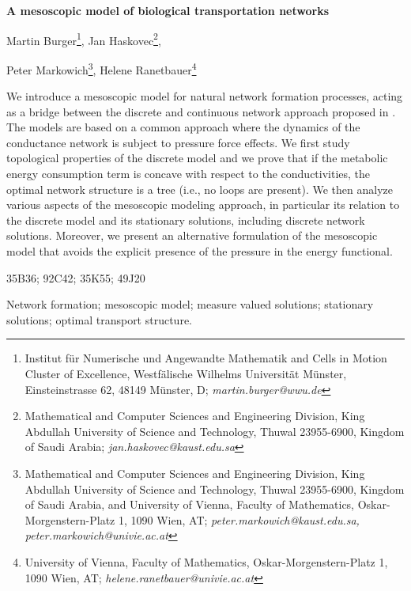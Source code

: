\documentclass{article}
\numberwithin{equation}{section}
\begin{document}
\centerline{{\Large\textbf{A mesoscopic model of biological transportation networks}}}
\vskip 7mm

\centerline{
	{\large Martin Burger}\footnote{Institut f\"ur Numerische und Angewandte Mathematik and Cells in Motion Cluster of Excellence, Westf\"alische Wilhelms Universit\"at M\"unster, Einsteinstrasse 62, 48149 M\"unster, D; 
		{\it martin.burger@wwu.de}},
	{\large Jan Haskovec}\footnote{Mathematical and Computer Sciences and Engineering Division,
		King Abdullah University of Science and Technology,
		Thuwal 23955-6900, Kingdom of Saudi Arabia; 
		{\it jan.haskovec@kaust.edu.sa}},
}
\centerline{
	{\large Peter Markowich}\footnote{Mathematical and Computer Sciences and Engineering Division,
		King Abdullah University of Science and Technology,
		Thuwal 23955-6900, Kingdom of Saudi Arabia, and University of Vienna, Faculty of Mathematics, Oskar-Morgenstern-Platz 1, 1090 Wien, AT;
		{\it peter.markowich@kaust.edu.sa, peter.markowich@univie.ac.at}},
	{\large Helene Ranetbauer}\footnote{University of Vienna, Faculty of Mathematics, Oskar-Morgenstern-Platz 1, 1090 Wien, AT;
		{\it helene.ranetbauer@univie.ac.at}}
	}
\vskip 10mm


          We introduce a mesoscopic model for natural network formation processes, acting as a bridge between the discrete and continuous network approach proposed in \cite{hu2013adaptation}.
	  The models are based on a common approach where the dynamics of the conductance network is subject to pressure force effects.
	  We first study topological properties of the discrete model and we prove that if the metabolic energy consumption term is concave with respect
	  to the conductivities, the optimal network structure is a tree (i.e., no loops are present).
	  We then analyze various aspects of the mesoscopic modeling approach, in particular its relation to the discrete model and its stationary solutions,
	  including discrete network solutions. Moreover, we present an alternative formulation of the mesoscopic model that avoids the explicit presence of the pressure
	  in the energy functional.
	  \vskip 7mm


 35B36; 92C42; 35K55; 49J20
\vspace{2mm}

 Network formation; mesoscopic model; measure valued solutions; stationary solutions; optimal transport structure.
\end{document}
